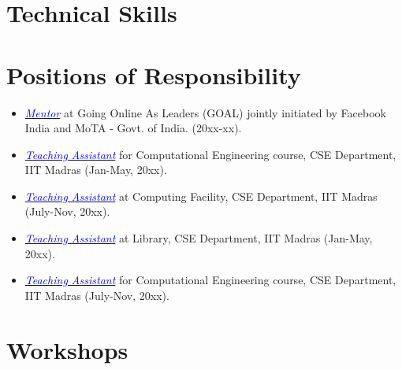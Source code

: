 \documentclass[11pt,a4paper,sans]{moderncv}
\begin{document}
{\vspace{-1em}
\section{Technical Skills}




\vspace{-1em}
\section{Positions of Responsibility}
\begin{itemize}
\item \textit{{\href{https://someLinks}
              {\textcolor{blue}{Mentor}}}} at Going Online As Leaders (GOAL) jointly initiated by Facebook India and MoTA - Govt. of India. (20xx-xx).

\item \textit{{\href{https://someLinks}{\textcolor{blue}{Teaching Assistant}}}} for Computational Engineering course, CSE Department, IIT Madras (Jan-May, 20xx).

\item \textit{{\href{https://someLinks}{\textcolor{blue}{Teaching Assistant}}}} at Computing Facility, CSE Department, IIT Madras (July-Nov, 20xx). 

\item \textit{{\href{https://someLinks}{\textcolor{blue}{Teaching Assistant}}}} at Library, CSE Department, IIT Madras (Jan-May, 20xx).

\item \textit{{\href{https://someLinks}{\textcolor{blue}{Teaching Assistant}}}} for Computational Engineering course, CSE Department, IIT Madras (July-Nov, 20xx).
\end{itemize}


\vspace{-1em}
\section{Workshops}

}
\end{document}
